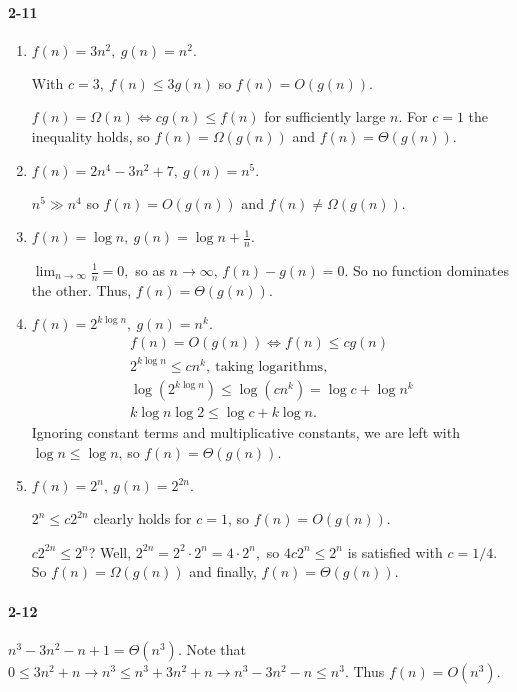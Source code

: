 \documentclass{report}
\begin{document}
\paragraph{2-11}
\begin{enumerate}[label=(\alph*)]
	\item $f(n) = 3n^2,\ g(n) = n^2.$

		With $c = 3,\ f(n) \le 3g(n)$ so $f(n) = O(g(n)).$

		$f(n) = \Omega(n) \iff cg(n) \le f(n)$ for sufficiently large $n$. For $c = 1$ the inequality holds, so $f(n) = \Omega(g(n))$ and $f(n) = \Theta(g(n)).$

	\item $f(n) = 2n^4 - 3n^2 + 7,\ g(n) = n^5.$

		$n^5 \gg n^4$ so $f(n) = O(g(n))$ and $f(n) \ne \Omega(g(n)).$

	\item $f(n) = \log n,\ g(n) = \log n + \frac{1}{n}.$

		$\lim_{n\to\infty} \frac{1}{n} = 0,$ so as $n\to\infty$, $f(n) - g(n) = 0$. So no function dominates the other. Thus, $f(n) = \Theta(g(n)).$

	\item $f(n) = 2^{k\log n},\ g(n) = n^k.$
		\begin{gather*}
			f(n) = O(g(n)) \iff f(n) \le cg(n) \\
			2^{k\log n} \le cn^k,\ \text{taking logarithms,} \\
			\log(2^{k\log n}) \le \log(cn^k)
				= \log c + \log n^k \\
			k\log n\log 2 \le \log c + k\log n.
		\end{gather*}
		Ignoring constant terms and multiplicative constants, we are left with
		$\log n \le \log n$, so $f(n) = \Theta(g(n)).$

	\item $f(n) = 2^n,\ g(n) = 2^{2n}.$

		$2^n \le c2^{2n}$ clearly holds for $c = 1$, so $f(n) = O(g(n)).$

		$c2^{2n} \le 2^n$? Well, $2^{2n} = 2^2\cdot2^n = 4\cdot2^n,$ so $4c2^n \le 2^n$ is satisfied with $c = 1/4.$ So $f(n) = \Omega(g(n))$ and finally, $f(n) = \Theta(g(n)).$
\end{enumerate}

\paragraph{2-12}$n^3 - 3n^2 -n + 1 = \Theta(n^3).$ Note that $0 \le 3n^2 + n \to n^3 \le n^3 + 3n^2 + n \to n^3 - 3n^2 - n \le n^3$. Thus $f(n) = O(n^3)$.
\end{document}
